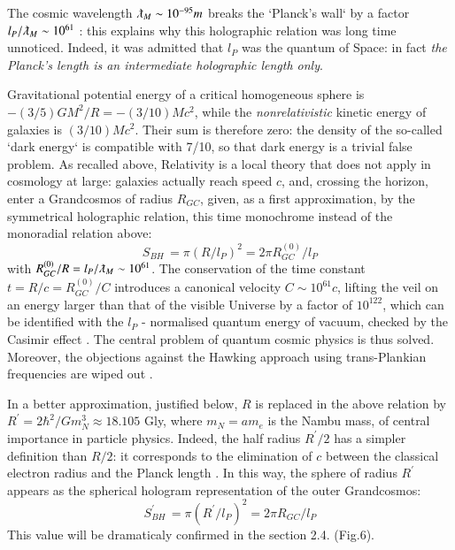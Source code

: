 \documentclass[twoside,draft]{article}
\begin{document}
\begin{sloppypar}
The cosmic wavelength $\lambdabar_{M}\sim 10^{-95} m$ breaks the `Planck's wall` by a factor $l_{P}/\lambdabar_{M}\sim 10^{61}$ : this explains why this holographic relation was long time unnoticed. Indeed, it was admitted that $l_{P}$ was the quantum of Space: in fact \textit{the Planck's length is an intermediate holographic length only}.

Gravitational potential energy of a critical homogeneous sphere is $-(3/5)GM^{2}/R = -
(3/10)Mc^{2}$, while the \textit{nonrelativistic} kinetic energy of galaxies is $(3/10)Mc^{2}$. Their sum is therefore zero: the density of the so-called `dark energy` is compatible with 7/10, so that dark energy is a
trivial false problem. As recalled above, Relativity is a local theory that does not apply in
cosmology at large: galaxies actually reach speed $c$, and, crossing the horizon, enter a Grandcosmos of
radius $R_{GC}$, given, as a first approximation, by the symmetrical holographic relation, this time
monochrome instead of the monoradial relation above:
\begin{equation}
S_{BH}\, = \pi(R/l_P )^{2} = 2\pi R^{(0)}_{GC} /l_{P}
\end{equation}
with $R^{(0)}_{GC} /R = l_{P} /\lambdabar_{M} \sim 10^{61}$. The conservation of the time constant $t = R/c = R^{(0)}_{GC} /C$ introduces a canonical velocity $C \sim 10^{61} c$, lifting the veil on an energy larger than that of the visible Universe by a factor of $10^{122}$, which can be identified with the $l_{P}$ - normalised quantum energy of vacuum, checked by
the Casimir effect \cite{Duplantier}. The central problem of quantum cosmic physics is thus solved. Moreover, the
objections against the Hawking approach using trans-Plankian frequencies are wiped out \cite{Damour}.

In a better approximation, justified below, $R$ is replaced in the above relation by $R^{\prime} = 2\hbar^{2}/Gm_{N}^{3}
\approx 18.105$ Gly, where $m_{N} = am_{e}$ is the Nambu mass, of central importance in particle
physics. Indeed, the half radius $R^{\prime}/2$ has a simpler definition than $R/2$: it corresponds to the
elimination of $c$ between the classical electron radius and the Planck length \cite{Sanchez1}. In this way, the sphere
of radius $R^{\prime}$ appears as the spherical hologram representation of the outer Grandcosmos:
\begin{equation}
S^{\prime}_{BH}\, = \pi(R^{\prime}/l_{P})^{2} = 2\pi R_{GC} /l_{P}
\end{equation}
This value will be dramaticaly confirmed in the section 2.4. (Fig.6).


\end{sloppypar}
\end{document}

